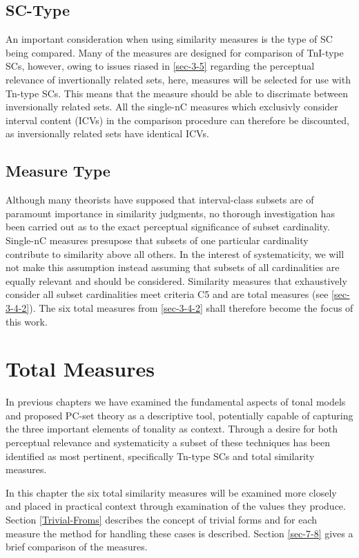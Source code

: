 \documentclass{article}
\begin{document}
\subsection{SC-Type}
\label{sec-6-3}

An important consideration when using similarity measures is the type
of SC being compared. Many of the measures are designed for comparison
of TnI-type SCs, however, owing to issues riased in \ref{sec-3-5} regarding the perceptual relevance of invertionally related
sets, here, measures will be selected for use with Tn-type SCs. This
means that the measure should be able to discrimate between
inversionally related sets. All the single-nC measures which
exclusivly consider interval content (ICVs) in the comparison
procedure can therefore be discounted, as inversionally related sets
have identical ICVs.
\subsection{Measure Type}
\label{sec-6-4}

Although many theorists have supposed that interval-class subsets are
of paramount importance in similarity judgments, no thorough
investigation has been carried out as to the exact perceptual
significance of subset cardinality. Single-nC measures presupose that
subsets of one particular cardinality contribute to similarity above
all others. In the interest of systematicity, we will not make this
assumption instead assuming that subsets of all cardinalities are
equally relevant and should be considered. Similarity measures that
exhaustively consider all subset cardinalities meet criteria C5 and
are total measures (see \ref{sec-3-4-2}). The six total measures
from \ref{sec-3-4-2} shall therefore become the focus of this
work.
\section{Total Measures}
\label{sec-7}

In previous chapters we have examined the fundamental aspects of tonal
models and proposed PC-set theory as a descriptive tool, potentially
capable of capturing the three important elements of tonality as
context. Through a desire for both perceptual relevance and
systematicity a subset of these techniques has been identified as most
pertinent, specifically Tn-type SCs and total similarity measures.

In this chapter the six total similarity measures will be examined
more closely and placed in practical context through examination of
the values they produce. Section \ref{Trivial-Froms} describes the concept
of trivial forms and for each measure the method for handling these
cases is described. Section \ref{sec-7-8} gives a brief
comparison of the measures.
\end{document}
